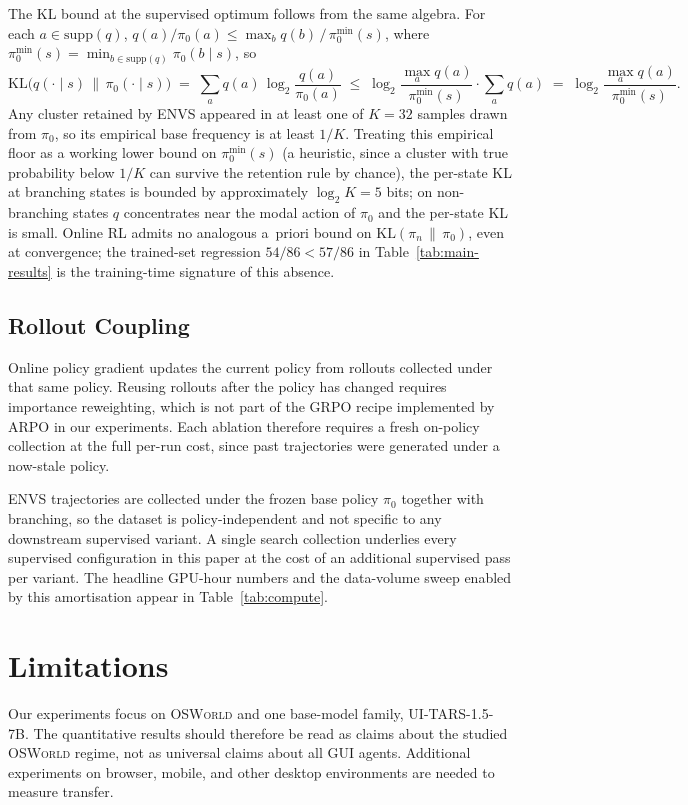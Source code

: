 \documentclass[11pt]{article}
\begin{document}
The KL bound at the supervised optimum follows from the same algebra.
For each $a \in \mathrm{supp}(q)$, $q(a)/\pi_0(a) \le \max_b q(b)\,/\,
\pi_0^{\min}(s)$, where $\pi_0^{\min}(s) = \min_{b \in \mathrm{supp}(q)}
\pi_0(b \mid s)$, so
\[
    \mathrm{KL}\bigl(q(\cdot \mid s)\,\big\|\,\pi_0(\cdot \mid s)\bigr)
    \;=\; \sum_a q(a)\,\log_2 \frac{q(a)}{\pi_0(a)}
    \;\le\; \log_2 \frac{\max_a q(a)}{\pi_0^{\min}(s)} \cdot \sum_a q(a)
    \;=\; \log_2 \frac{\max_a q(a)}{\pi_0^{\min}(s)}.
\]
Any cluster retained by \textsc{ENVS} appeared in at least one of $K =
32$ samples drawn from $\pi_0$, so its empirical base frequency is at
least $1/K$. Treating this empirical floor as a working lower bound on
$\pi_0^{\min}(s)$ (a heuristic, since a cluster with true probability
below $1/K$ can survive the retention rule by chance), the per-state KL
at branching states is bounded by approximately $\log_2 K = 5$ bits;
on non-branching states $q$ concentrates near the modal action of
$\pi_0$ and the per-state KL is small. Online RL admits no analogous
a~priori bound on $\mathrm{KL}(\pi_n \,\|\, \pi_0)$, even at convergence;
the trained-set regression $54/86 < 57/86$ in
Table~\ref{tab:main-results} is the training-time signature of this
absence.

\subsection{Rollout Coupling}
\label{app:rl:cost}

Online policy gradient updates the current policy from rollouts collected
under that same policy. Reusing rollouts after the policy has changed
requires importance reweighting, which is not part of the GRPO recipe
implemented by ARPO in our experiments. Each ablation therefore requires
a fresh on-policy collection at the full per-run cost, since past
trajectories were generated under a now-stale policy.

\textsc{ENVS} trajectories are collected under the frozen base policy
$\pi_0$ together with branching, so the dataset is policy-independent
and not specific to any downstream supervised variant. A single search
collection underlies every supervised configuration in this paper at
the cost of an additional supervised pass per variant. The headline
GPU-hour numbers and the data-volume sweep enabled by this amortisation
appear in Table~\ref{tab:compute}.

\section{Limitations}
\label{app:limitations}
Our experiments focus on \textsc{OSWorld} and one base-model family, UI-TARS-1.5-7B. The quantitative results should therefore be read as claims about the studied \textsc{OSWorld} regime, not as universal claims about all GUI agents. Additional experiments on browser, mobile, and other desktop environments are needed to measure transfer.
\end{document}
